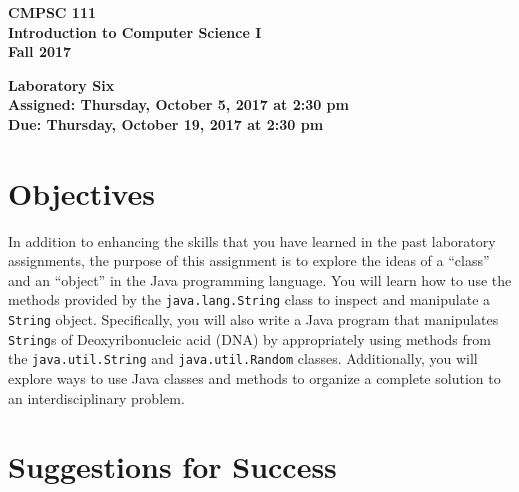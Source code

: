 \documentclass[11pt]{article}
\newcommand{\assignmentduedate}{October 19}
\newcommand{\assignmentassignedate}{October 5}
\newcommand{\assignmentnumber}{Six}
\newcommand{\labyear}{2017}
\newcommand{\labday}{Thursday}
\newcommand{\labtime}{2:30 pm}
\newcommand{\assigneddate}{Assigned: \labday, \assignmentassignedate, \labyear{} at \labtime{}}
\newcommand{\duedate}{Due: \labday, \assignmentduedate, \labyear{} at \labtime{}}
\newcommand{\labtitle}[1]
{
  \begin{center}
    \begin{center}
      \bf
      CMPSC 111\\Introduction to Computer Science I\\
      Fall 2017\\
      \medskip
    \end{center}
    \bf
    #1
  \end{center}
}
\begin{document}
\thispagestyle{empty}

\labtitle{Laboratory \assignmentnumber{} \\ \assigneddate{} \\ \duedate{}}

\section*{Objectives}

In addition to enhancing the skills that you have learned in the past laboratory assignments, the purpose of this
assignment is to explore the ideas of a ``class'' and an ``object'' in the Java programming language. You will learn how
to use the methods provided by the {\tt java.lang.String} class to inspect and manipulate a {\tt String} object.
Specifically, you will also write a Java program that manipulates {\tt String}s of Deoxyribonucleic acid (DNA) by
appropriately using methods from the {\tt java.util.String} and {\tt java.util.Random} classes. Additionally, you will
explore ways to use Java classes and methods to organize a complete solution to an interdisciplinary problem.

\section*{Suggestions for Success}
\end{document}
